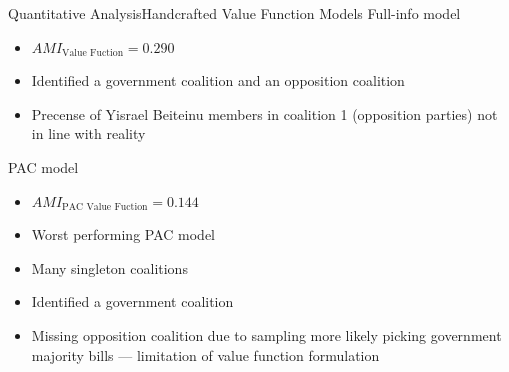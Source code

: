 \documentclass[xcolor=dvipsnames]{beamer}
\newcommand{\AMI}{\mathit{AMI}}
\begin{document}
\begin{frame}{Quantitative Analysis}{Handcrafted Value Function Models}
  Full-info model
  \begin{itemize}
    \item $\AMI_{\text{Value Fuction}} = 0.290$
    \item Identified a government coalition and an opposition coalition
    \item Precense of Yisrael Beiteinu members in coalition 1 (opposition parties) not in line with reality
  \end{itemize}
  PAC model
  \begin{itemize}
    \item $\AMI_{\text{PAC Value Fuction}} = 0.144$
    \item Worst performing PAC model
    \item Many singleton coalitions
    \item Identified a government coalition
    \item Missing opposition coalition due to sampling more likely picking government majority bills --- limitation of value function formulation
  \end{itemize}
\end{frame}
\end{document}
